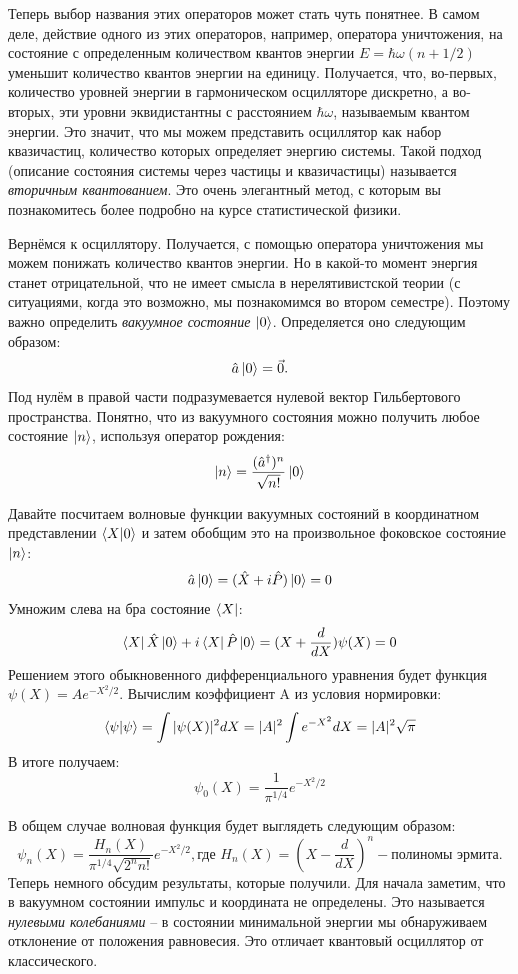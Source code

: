 Теперь выбор названия этих операторов может стать чуть понятнее. В самом деле, действие одного из этих операторов, например, оператора уничтожения, на состояние с определенным количеством квантов энергии $E = \hbar\omega(n + 1/2)$ уменьшит количество квантов энергии на единицу. Получается, что, во-первых, количество уровней энергии в гармоническом осцилляторе дискретно, а во-вторых, эти уровни эквидистантны с расстоянием $\hbar\omega$, называемым квантом энергии. Это значит, что мы можем представить осциллятор как набор квазичастиц, количество которых определяет энергию системы. Такой подход (описание состояния системы через частицы и квазичастицы) называется \textit{вторичным квантованием}. Это очень элегантный метод, с которым вы познакомитесь более подробно на курсе статистической физики.

Вернёмся к осциллятору. Получается, с помощью оператора уничтожения мы можем понижать количество квантов энергии. Но в какой-то момент энергия станет отрицательной, что не имеет смысла в нерелятивистской теории (с ситуациями, когда это возможно, мы познакомимся во втором семестре). Поэтому важно определить \textit{вакуумное состояние} $\ket{0}$. Определяется оно следующим образом:
\[
\hat{a}\ket{0} = \vec 0.
\]
Под нулём в правой части подразумевается нулевой вектор Гильбертового пространства. Понятно, что из вакуумного состояния можно получить любое состояние $\ket{n}$, используя оператор рождения:
\[
\ket{n} = \frac{(\hat{a}^{\dagger})^n}{\sqrt{n!}}\ket{0}
\]

Давайте посчитаем волновые функции вакуумных состояний в координатном представлении $\bra{X}\ket{0}$ и затем обобщим это на произвольное фоковское состояние $\ket{n}$:
\[
\hat{a}\ket{0} = (\hat{X} + i\hat{P})\ket{0} = 0
\]
Умножим слева на бра состояние $\bra{X}$:
\[
\bra{X}\hat{X}\ket{0} + i\bra{X}\hat{P}\ket{0} = (X + \frac{d}{dX})\psi(X) = 0
\]
Решением этого обыкновенного дифференциального уравнения будет функция $\psi(X) = Ae^{-X^2/2}$. Вычислим коэффициент A из условия нормировки:
\[
\braket{\psi} = \int |\psi(X)|^2 dX = |A|^2\int e^{-X^2}dX = |A|^2\sqrt{\pi}
\]
В итоге получаем:
\[
\psi_0(X) = \frac{1}{\pi^{1/4}}e^{-X^2/2}
\]

В общем случае волновая функция будет выглядеть следующим образом:
\[
\psi_n(X) = \frac{H_n(X)}{\pi^{1/4}\sqrt{2^n n!}}e^{-X^2/2}, \text{где } H_n(X) = (X - \frac{d}{dX})^n - \text{полиномы эрмита}.
\]
Теперь немного обсудим результаты, которые получили. Для начала заметим, что в вакуумном состоянии импульс и координата не определены. Это называется \textit{нулевыми колебаниями} – в состоянии минимальной энергии мы обнаруживаем отклонение от положения равновесия. Это отличает квантовый осциллятор от классического.

